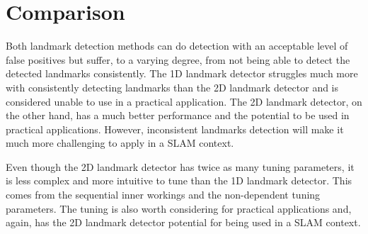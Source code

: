 \section{Comparison}

Both landmark detection methods can do detection with an acceptable level of false positives but suffer, to a varying degree, from not being able to detect the detected landmarks consistently. The 1D landmark detector struggles much more with consistently detecting landmarks than the 2D landmark detector and is considered unable to use in a practical application. The 2D landmark detector, on the other hand, has a much better performance and the potential to be used in practical applications.  However, inconsistent landmarks detection will make it much more challenging to apply in a SLAM context.

Even though the 2D landmark detector has twice as many tuning parameters, it is less complex and more intuitive to tune than the 1D landmark detector. This comes from the sequential inner workings and the non-dependent tuning parameters. The tuning is also worth considering for practical applications and, again, has the 2D landmark detector potential for being used in a SLAM context. 
